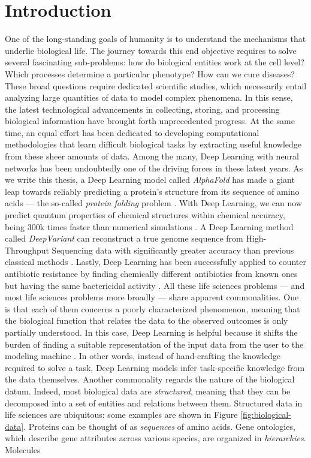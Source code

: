 
\chapter{Introduction}\label{ch:introduction}
One of the long-standing goals of humanity is to understand the mechanisms that underlie biological life. The journey towards this end objective requires to solve several fascinating sub-problems: how do biological entities work at the cell level? Which processes determine a particular phenotype? How can we cure diseases? These broad questions require dedicated scientific studies, which necessarily entail analyzing large quantities of data to model complex phenomena. In this sense, the latest technological advancements in collecting, storing, and processing biological information have brought forth unprecedented progress. At the same time, an equal effort has been dedicated to developing computational methodologies that learn difficult biological tasks by extracting useful knowledge from these sheer amounts of data. Among the many, Deep Learning with neural networks \citep{lecun2015naturedeeplearning} has been undoubtedly one of the driving forces in these latest years. As we write this thesis, a Deep Learning model called \emph{AlphaFold} has made a giant leap towards reliably predicting a protein's structure from its sequence of amino acids --- the so-called \emph{protein folding} problem \citep{senior2020alphafold}. With Deep Learning, we can now predict quantum properties of chemical structures within chemical accuracy, being 300k times faster than numerical simulations  \citep{gilmer2017neuralmessagepassing}. A Deep Learning method called \emph{DeepVariant} can reconstruct a true genome sequence from High-Throughput Sequencing data with significantly greater accuracy than previous classical methods \citep{poplin2018deepvariant}. Lastly, Deep Learning has been successfully applied to counter antibiotic resistance by finding chemically different antibiotics from known ones but having the same bactericidal activity \citep{stokes2020deeplearningantibiotic}. All these life sciences problems --- and most life sciences problems more broadly --- share apparent commonalities. One is that each of them concerns a poorly characterized phenomenon, meaning that the biological function that relates the data to the observed outcomes is only partially understood. In this case, Deep Learning is helpful because it shifts the burden of finding a suitable representation of the input data from the user to the modeling machine \citep{bengio2014representationlearning}. In other words, instead of hand-crafting the knowledge required to solve a task, Deep Learning models infer task-specific knowledge from the data themselves. Another commonality regards the nature of the biological datum. Indeed, most biological data are \emph{structured}, meaning that they can be decomposed into a set of entities and relations between them. Structured data in life sciences are ubiquitous: some examples are shown in Figure \ref{fig:biological-data}. Proteins can be thought of as \emph{sequences} of amino acids. Gene ontologies, which describe gene attributes across various species, are organized in \emph{hierarchies}. Molecules 